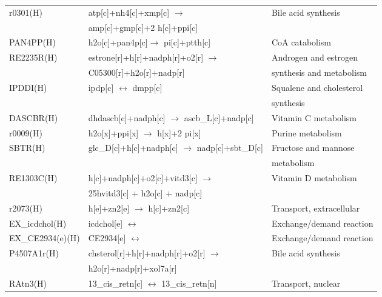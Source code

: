\begin{table}[h]
\begin{center}
\begin{tabular*}{\textwidth}{l @{\extracolsep{\fill}} ll}
	r0301(H)             			& atp[c]+nh4[c]+xmp[c] $\rightarrow$ & Bile acid synthesis        \\
	                                & amp[c]+gmp[c]+2 h[c]+ppi[c] & \\
	PAN4PP(H)            			& h2o[c]+pan4p[c]$\rightarrow$ pi[c]+ptth[c] & CoA catabolism       \\
	RE2235R(H)           			& estrone[r]+h[r]+nadph[r]+o2[r] $\rightarrow$ & Androgen and estrogen        \\
	                                &  C05300[r]+h2o[r]+nadp[r]                    & synthesis and metabolism \\
	IPDDI(H)             			& ipdp[c] $\leftrightarrow$ dmpp[c] & Squalene and cholesterol         \\
	 & &  synthesis\\
	DASCBR(H)            			& dhdascb[c]+nadph[c] $\rightarrow$ ascb\_L[c]+nadp[c] & Vitamin C metabolism        \\
	r0009(H)             			& h2o[x]+ppi[x] $\rightarrow$ h[x]+2 pi[x] & Purine metabolism      \\
	SBTR(H)             			& glc\_D[c]+h[c]+nadph[c] $\rightarrow$ nadp[c]+sbt\_D[c] & Fructose and mannose         \\
	& & metabolism\\
	RE1303C(H)           			& h[c]+nadph[c]+o2[c]+vitd3[c] $\rightarrow$   & Vitamin D metabolism      \\
	                                & 25hvitd3[c] + h2o[c] + nadp[c]               &\\
	r2073(H)             			& h[e]+zn2[e] $\rightarrow$ h[c]+zn2[c] & Transport, extracellular        \\
	EX\_icdchol(H)        			& icdchol[e] $\leftrightarrow$ & Exchange/demand reaction       \\
	EX\_CE2934(e)(H)      			& CE2934[e] $\leftrightarrow$ & Exchange/demand reaction        \\
	P4507A1r(H)          			& chsterol[r]+h[r]+nadph[r]+o2[r] $\rightarrow$ & Bile acid synthesis        \\
	                                & h2o[r]+nadp[r]+xol7a[r] & \\
	RAtn3(H)             			& 13\_cis\_retn[c] $\leftrightarrow$ 13\_cis\_retn[n] & Transport, nuclear       \\
	\hline
	\end{tabular*}
\end{center}
\label{GIM:tblsRxn}%
\end{table}